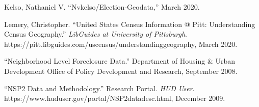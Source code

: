 \documentclass[
]{article}
\begin{document}
\leavevmode\hypertarget{ref-kelso2020nvkelso}{}%
Kelso, Nathaniel V. ``Nvkelso/Election-Geodata,'' March 2020.

\leavevmode\hypertarget{ref-lemery2020united}{}%
Lemery, Christopher. ``United States Census Information @ Pitt: Understanding Census Geography.'' \emph{LibGuides at University of Pittsburgh}. https://pitt.libguides.com/uscensus/understandinggeography, March 2020.

\leavevmode\hypertarget{ref-2008neighborhood}{}%
``Neighborhood Level Foreclosure Data.'' Department of Housing \& Urban Development Office of Policy Development and Research, September 2008.

\leavevmode\hypertarget{ref-defilippo2009nsp2}{}%
``NSP2 Data and Methodology.'' Research Portal. \emph{HUD User}. https://www.huduser.gov/portal/NSP2datadesc.html, December 2009.
\end{document}
